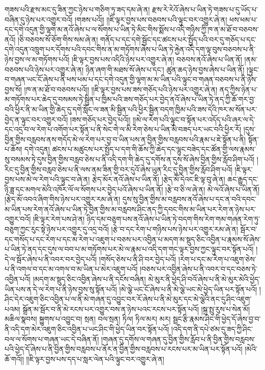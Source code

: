 གཟས་པའི་རྫས་མང་དུ་ཟིན་ཀྱང་ཉེས་པ་གཅིག་ཏུ་ཟད་དམ་ཞེ་ན། རྫས་རེ་རེའོ་ཞེས་པ་ཡིན་ཏེ་གཟས་པ་དུ་ཡོད་པ་བཞིན་དུ་ཉེས་པར་འགྱུར་བའོ། །གཟས་པའོ།། །།ཇི་ལྟར་བྱས་པས་བཅབས་པའི་ལྟུང་བར་འགྱུར་ཞེ་ན། ཕས་ཕམ་པ་དང་དགེ་འདུན་གྱི་ལྷག་མ་ནའོ་ཞེས་པ་ལ་སོགས་པ་ཡིན་ཏེ་མིང་གིས་སྨོས་པ་འདི་གཉིས་ཀྱི་ཁ་ན་མ་ཐོ་བ་བཅབས་ནའོ། །ཅི་བཅབས་སོ་ཅོག་གིས་སམ་ཞེ་ན། གནོད་པ་དང་དགེ་སྦྱོང་དང་ཚངས་པར་སྤྱོད་པའི་བར་དུ་གཅོད་པ་དང་དགེ་འདུན་འཁྲུག་པར་དོགས་པའི་དབང་གིས་ན་མ་གཏོགས་ཞེས་པ་ཡིན་ཏེ་རྐྱེན་འདི་དག་ལྟ་བུས་བཅབས་པ་ནི་ཉེས་བྱས་ལ་མ་གཏོགས་པའོ། །ཇི་ལྟར་བྱས་པས་འདིའི་ཉེས་པར་འགྱུར་ཞེ་ན། བཅབས་ནའོ་ཞེས་པ་ཡིན་ནོ། །ནམ་བཅབས་པའི་ཉེས་པར་འགྱུར་ཞེ་ན། ཉིན་ཞག་གི་མཐས་སོ་ཞེས་པ་དང་། ཚུན་ཆད་ཉེས་བྱས་ཞེས་པ་ཡིན་ནོ། །ལྟུང་བ་གཞན་ཡང་ངོ་ཞེས་པ་ནི་ཕས་ཕམ་པ་དང་དགེ་འདུན་གྱི་ལྷག་མ་མ་ཡིན་པའི་ལྟུང་བ་གཞན་བཅབས་པ་ནི་ཉེས་བྱས་སོ། །ཁ་ན་མ་ཐོ་བ་བཅབས་པའོ།། །།ཇི་ལྟར་བྱས་པས་ཟས་གཅོད་པའི་ཉེས་པར་འགྱུར་ཞེ་ན། ནད་ཀྱིས་ཉེན་པ་མ་གཏོགས་པར་ཆེད་དུ་བསམས་ཏེ་སྦྱིན་པ་ཁྱིམ་པའི་ཟས་གཅོད་པར་བྱེད་ནའོ་ཞེས་པ་ཡིན་ཏེ་ནད་ཀྱི་ཆོ་གར་བྱ་བའི་ཕྱིར་ནི་མ་ཡིན་གྱི་ཆེད་དུ་དགེ་སློང་ལ་ཟན་མི་སྦྱིན་པའི་ཕྱིར་སྦྱིན་བདག་ཁྱིམ་པའི་ཟས་དེའི་ཁར་མ་སོན་པར་བྱེད་ན་ལྟུང་བར་འགྱུར་བའོ། །ཟས་གཅོད་པར་བྱེད་པའོ།། །།མེ་ལ་རེག་པའི་ལྟུང་བ་སྟོན་པར་འདོད་པའི་ཞར་ལ་དེ་དང་འདྲ་བ་ལ་རེག་པ་འགོག་པར་སྟོན་པ་ནི་སེང་གེ་ལ་མི་རེག་ཅེས་པ་ཡིན་མི་བཟད་པར་ཡང་བའི་ཕྱིར་རོ། །དུས་བྱིན་གྱིས་བརླབས་ནས་གདོད་མེ་ལ་རེག་པར་བྱ་བ་ཡིན་པས་ན་བྱིན་གྱིས་བརླབས་པའི་རྣམ་པ་ཇེ་སྟོན་པ་ནི། སྟོན་པ་ཆོས། དགེ་འདུན། ཚངས་པ་མཚུངས་པར་སྤྱོད་པ་དག་གི་ཆོས་ཀྱི་ཆེད་དང་ལྷུང་བཟེད་དང་ཚོན་གྱི་ལས་རྣམས་སུ་བསམས་ཏེ་དུས་བྱིན་གྱིས་བརླབ་ཅེས་པ་ནི་འདི་དག་གི་ཆེད་དུ་དགོས་ན་དུས་སོ་ཞེས་བྱིན་གྱིས་རློབ་ཤིག་པའོ། །རིང་དུ་བྱིན་གྱིས་བརླབ་ཅེས་པ་ནི་ལས་ནམ་ཟིན་གྱི་བར་དུའོ་ཞེས་ཡུན་རིང་དུ་བྱིན་གྱིས་རློབ་ཤིག་པའོ། །ཇི་ལྟར་བྱས་པས་མེ་ལ་རེག་པའི་ལྟུང་བ་ཞེ་ན། རྩེད་མོར་ནའོ་ཞེས་པ་ཡིན་ནོ། །རྩེད་མོ་དེའང་ཇི་ལྟ་བུ་ཞེ་ན། ཆང་རྒྱུད་དང་ཉི་ཟླ་དང་མགལ་མེའི་འཁོར་ལོ་ལ་སོགས་པར་བྱེད་པའོ་ཞེས་པ་ཡིན་ནོ། །རྩེ་བ་ཅི་ལ་ཞེ་ན། མེ་ལའོ་ཞེས་པ་ཡིན་ནོ། །རྩེད་མོ་འབའ་ཞིག་གིས་ཉེས་པར་འགྱུར་རམ་ཞེ་ན། དུས་སུ་བྱིན་གྱིས་མ་བརླབས་ནའོ་ཞེས་པ་དང་ན་བའི་དབང་མ་ཡིན་པས་རེག་ནའོ་ཞེས་པ་ཡིན་ཏེ་བྱིན་གྱིས་མ་བརླབས་ཤིང་ནད་ཀྱི་དབང་གིས་མ་ཡིན་པར་རེག་ན་ཉེས་པར་འགྱུར་བའོ། །ཇི་ལྟར་རེག་པས་ཤེ་ན། ཉིད་དམ་བཅུག་པས་ནའོ་ཞེས་པ་ཡིན་ཏེ་བདག་གིས་རེག་གམ་གཞན་རེག་ཏུ་བཅུག་ཀྱང་རུང་སྟེ་ཉེས་པར་འགྱུར་དུ་འདྲ་བའོ། །རྩེ་བ་དང་རེག་པ་གཉིས་པས་ཉེས་པར་འགྱུར་རམ་ཞེ་ན། སྦོར་བ་དང་གསོད་པ་དང་རེག་པ་དང་མ་རེག་པ་འཇུག་པ་བཅས་པར་འབྱིན་པ་མདག་མ་སྡུད་ཅིང་འབྱིན་པ་རྣམས་སོ་ཞེས་པ་ཡིན་ཏེ་ནད་དང་དུས་ལ་བབ་པ་མ་གཏོགས་པར་མེ་ལ་རྣམ་པ་འདི་དག་གང་ལྟར་བྱས་ཀྱང་ལྟུང་བར་སྟོན་པའོ། །དེ་ལ་སྦོར་ཞེས་པ་ནི་འབར་བར་བྱེད་པའོ། །གསོད་ཅེས་པ་ནི་ཤི་བར་བྱེད་པའོ། །རེག་པ་དང་མ་རེག་པ་འཇུག་ཅེས་པ་ནི་འགལ་བ་དང་མ་འགལ་བ་མ་ཡིན་པ་མེར་འཇུག་པའོ། །བཅས་པར་འབྱིན་ཞེས་པ་ནི་འབར་བ་དང་བཅས་ཏེ་འབྱིན་པའོ། །མདག་མ་སྡུད་ཅིང་འབྱིན་ཞེས་པ་ནི་དངོས་བཞིན། མེ་མུར་ནི་ཕྱེད་ཤི་བའོ་ཞེས་པ་ནི་མེ་མུར་མེའི་ཕྱེད་ཡིན་པས་ན་དེ་ལ་རེག་པ་ནི་ཉེས་བྱས་སུ་སྟོན་པའོ། །མེ་ལྕེ་ཡང་ངོ་ཞེས་པ་ནི་མེ་ལྕེ་ཡང་མེ་ཕྱེད་ཡིན་པར་སྟོན་པའོ། །ཤིང་དེར་འཇུག་ཅིང་འབྱིན་པ་ལ་ནི་མེ་གཞན་དུ་འབྱུང་བར་རོ་ཞེས་པ་ནི་མེ་མུར་དང་མེ་ལྕེའི་ནང་དུ་ཤིང་འཇུག་པའམ། སྒྲོན་མ་སྦོར་བ་ནི་མེ་རངས་པར་འགྱུར་བས་ན་ཉེས་པའང་རངས་པར་སྟོན་པའོ། །སྐྲ་སྤུ་རུས་པ་སེན་མོ། མཆིལ་སྣབས། སྐྱུགས་པ་འབྱུང་བ། སྲན། བལ་སྲན། ཏིལ། ཏིལ་མར། མར། སྦྲང་རྩི་རྣམས་ཤིང་གི་ཕྱེད་དོ་ཞེས་བྱ་བ་ནི་འདི་དག་མེར་འཇུག་ཅིང་འབྱིན་པ་ཡང་ཤིང་གི་ཕྱེད་ཡིན་བར་སྟོན་པའོ། །འདི་དག་ནི་དཔེ་ཙམ་དུ་ཟད་ཀྱི་ཤིང་བལ་ལ་སོགས་པ་གཞན་ཡང་དེ་བཞིན་ནོ། །གཞན་དུ་དགོས་ལ་གཞན་དུ་བྱིན་གྱིས་རློབ་པ་ནི་བྱིན་གྱིས་བརླབས་པའི་ཕྱེད་དོ་ཞེས་པ་ནི་བྱིན་གྱིས་བརླབས་པ་ནོར་ན་བྱིན་གྱིས་བརླབས་པ་རངས་པར་མ་ཡིན་པར་སྟོན་པའོ། །མེའི་ཆོ་གའོ།། །།ཇི་ལྟར་བྱས་པས་དད་པ་སླར་ལེན་པའི་ལྟུང་བར་འགྱུར་ཞེ་ན། 